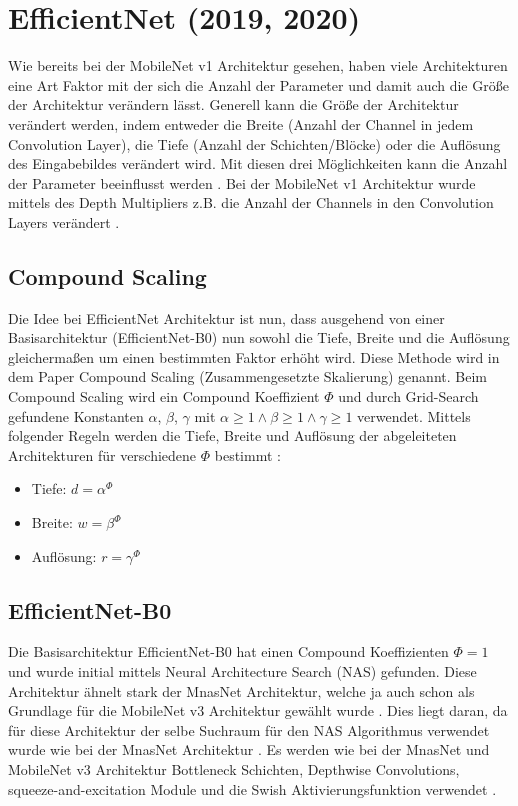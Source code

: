\documentclass[conference]{IEEEtran}
\begin{document}
\section{EfficientNet (2019, 2020)}
Wie bereits bei der MobileNet v1 Architektur gesehen, haben viele Architekturen eine Art Faktor mit der sich die Anzahl der Parameter und damit auch die Größe der Architektur verändern lässt. 
Generell kann die Größe der Architektur verändert werden, indem entweder die Breite (Anzahl der Channel in jedem Convolution Layer), die Tiefe (Anzahl der Schichten/Blöcke) oder die Auflösung des Eingabebildes verändert wird. Mit diesen drei Möglichkeiten kann die Anzahl der Parameter beeinflusst werden \cite{b7}.
Bei der MobileNet v1 Architektur wurde mittels des Depth Multipliers z.B. die Anzahl der Channels in den Convolution Layers verändert \cite{b4}.

\subsection{Compound Scaling}
Die Idee bei EfficientNet Architektur ist nun, dass ausgehend von einer Basisarchitektur (EfficientNet-B0) nun sowohl die Tiefe, Breite und die Auflösung gleichermaßen um einen bestimmten Faktor erhöht wird. Diese Methode wird in dem Paper Compound Scaling (Zusammengesetzte Skalierung) genannt\cite{b7}. Beim Compound Scaling wird ein Compound Koeffizient $\Phi$ und durch Grid-Search gefundene Konstanten $\alpha$, $\beta$, $\gamma$ mit $\alpha \geq 1 \land \beta \geq 1 \land \gamma \geq 1$ verwendet. Mittels folgender Regeln werden die Tiefe, Breite und Auflösung der abgeleiteten Architekturen für verschiedene $\Phi$ bestimmt \cite{b7}:
\begin{itemize}
\item Tiefe: $d = \alpha ^ \Phi$
\item Breite: $w = \beta ^ \Phi$
\item Auflösung: $r = \gamma ^ \Phi$
\end{itemize}

\subsection{EfficientNet-B0}
Die Basisarchitektur EfficientNet-B0 hat einen Compound Koeffizienten $\Phi = 1$ und wurde initial mittels Neural Architecture Search (NAS) gefunden. Diese Architektur ähnelt stark der MnasNet Architektur, welche ja auch schon als Grundlage für die MobileNet v3 Architektur gewählt wurde \cite{b4}. Dies liegt daran, da für diese Architektur der selbe Suchraum für den NAS Algorithmus verwendet wurde wie bei der MnasNet Architektur \cite{b7}. Es werden wie bei der MnasNet und MobileNet v3 Architektur Bottleneck Schichten, Depthwise Convolutions, squeeze-and-excitation Module und die Swish Aktivierungsfunktion verwendet \cite{b4}.
\end{document}
